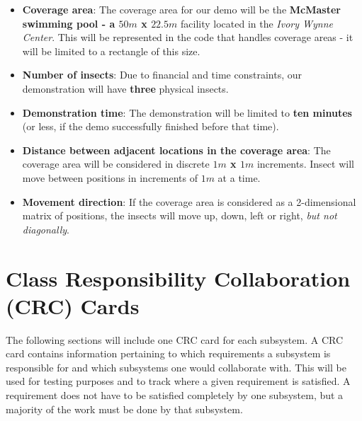 \documentclass[11pt]{article}
\begin{document}
\begin{itemize}
    \item \textbf{Coverage area}: The coverage area for our demo
    will be the \textbf{McMaster swimming pool - a $50m$ x $22.5m$} facility located in the \textit{Ivory Wynne Center}. This will be
    represented in the code that handles coverage areas - it will be limited to a rectangle of this size.
    
    \item \textbf{Number of insects}: Due to financial and time constraints, our demonstration will have \textbf{three} physical insects.
    
    \item \textbf{Demonstration time}: The demonstration will be limited to \textbf{ten minutes} (or less, if the demo successfully finished before
    that time).
    
    \item \textbf{Distance between adjacent locations in the coverage area}: The coverage area will be considered in discrete \textbf{$1m$ x $1m$} increments. Insect will move between positions in increments of $1m$ at a time.
    
    \item \textbf{Movement direction}: If the coverage area is considered as a 2-dimensional matrix of positions, the insects will move up, down, left
    or right, \textit{but not diagonally}.
\end{itemize}

\section{Class Responsibility Collaboration (CRC) Cards}
The following sections will include one CRC card for each subsystem. A CRC card contains information pertaining to which requirements a subsystem is responsible for and which subsystems one would collaborate with. This will be used for testing purposes and to track where a given requirement is satisfied. A requirement does not have to be satisfied completely by one subsystem, but a majority of the work must be done by that subsystem.
\end{document}
